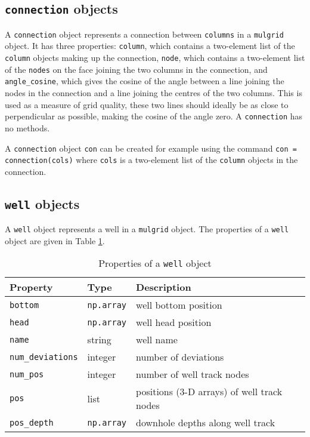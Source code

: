 \subsection{\texttt{connection} objects}
\label{connections}

A \texttt{connection} object represents a connection between \texttt{columns} in a \texttt{mulgrid} object.  It has three properties: \texttt{column}, which contains a two-element list of the \texttt{column} objects making up the connection, \texttt{node}, which contains a two-element list of the \texttt{nodes} on the face joining the two columns in the connection, and \texttt{angle\_cosine}, which gives the cosine of the angle between a line joining the nodes in the connection and a line joining the centres of the two columns.  This is used as a measure of grid quality, these two lines should ideally be as close to perpendicular as possible, making the cosine of the angle zero.  A \texttt{connection} has no methods.

A \texttt{connection} object \texttt{con} can be created for example using the command \texttt{con = connection(cols)} where \texttt{cols} is a two-element list of the \texttt{column} objects in the connection.

\subsection{\texttt{well} objects}

A \texttt{well} object represents a well in a \texttt{mulgrid} object.  The properties of a \texttt{well} object are given in Table \ref{tb:well_properties}.

\begin{table}
  \begin{center}
    \begin{tabular}{|l|l|l|}
      \hline
      \textbf{Property} & \textbf{Type} & \textbf{Description}\\
      \hline
      \texttt{bottom} & \texttt{np.array} & well bottom position \\
      \texttt{head} & \texttt{np.array} & well head position \\
      \texttt{name} & string & well name \\
      \texttt{num\_deviations} & integer & number of deviations \\
      \texttt{num\_pos} & integer & number of well track nodes \\
      \texttt{pos} & list & positions (3-D arrays) of well track nodes \\
      \texttt{pos\_depth} & \texttt{np.array} & downhole depths along well track \\
      \hline
    \end{tabular}
    \caption{Properties of a \texttt{well} object}
    \label{tb:well_properties}
  \end{center}
\end{table}

